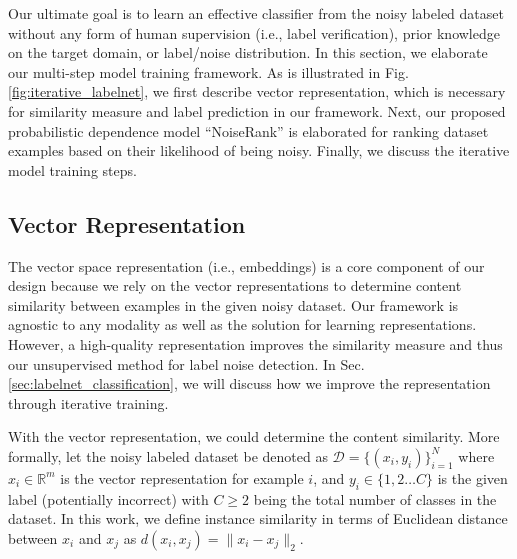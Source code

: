 Our ultimate goal is to learn an effective classifier from the noisy labeled dataset without any form of human supervision (i.e., label verification), prior knowledge on the target domain, or label/noise distribution. In this section, we elaborate our multi-step model training framework. As is illustrated in Fig. \ref{fig:iterative_labelnet}, we first describe vector representation, which is necessary for similarity measure and label prediction in our framework. Next, our proposed probabilistic dependence model ``NoiseRank'' is elaborated for ranking dataset examples based on their likelihood of being noisy. Finally, we discuss the iterative model training steps. 














\subsection{Vector Representation} \label{sec:rep_learning}

The vector space representation (i.e., embeddings) is a core component of our design because we rely on the vector representations to determine content similarity between examples in the given noisy dataset. Our framework is agnostic to any modality as well as the solution for learning representations. However, a high-quality representation improves the similarity measure and thus our unsupervised method for label noise detection. In Sec. \ref{sec:labelnet_classification}, we will discuss how we improve the representation through iterative training.

With the vector representation, we could determine the content similarity. More formally, let the noisy labeled dataset be denoted as $\mathcal{D} = \{(x_i, y_i)\}_{i=1}^{N}$ where $x_i\in \mathbb{R}^m$ is the vector representation for example $i$, and $y_i \in \{1,2 \dots C\}$ is the given label (potentially incorrect) with $C\geq2$ being the total number of classes in the dataset. In this work, we define instance similarity in terms of Euclidean distance between $x_i$ and $x_j$ as $d(x_i, x_j) = \| x_i - x_j \|_2$.






































